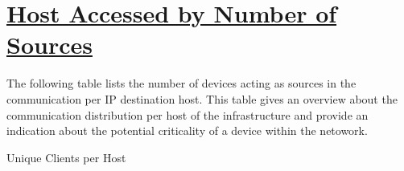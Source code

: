 %
%
%

\chapter[Host Accessed by Number of Sources]{\underline{Host Accessed by Number of Sources}}
\begin{flushleft}
The following table lists the number of devices acting as sources in the communication per IP destination host. This table gives an overview about the communication distribution per host of the infrastructure and provide an indication about the potential criticality of a device within the netowork.
\end{flushleft}

\begin{table}[H]
  \begin{center}
    \caption[\normalsize{Unique Clients per Host}]{\small{Unique Clients per Host}}
  \end{center}
\end{table}

